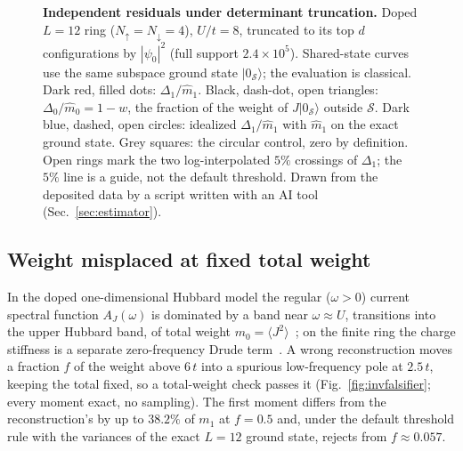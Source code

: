 \documentclass[aps,prb,reprint,onecolumn,12pt,superscriptaddress,longbibliography,floatfix]{revtex4-2}
\newcommand{\colfig}{\setlength{\columnwidth}{0.62\textwidth}}%
\newcommand{\colfig}{}
\begin{document}
\begin{figure}[t]
\centering\colfig
{}
\caption{\textbf{Independent residuals under determinant truncation.} Doped $L=12$ ring ($N_\uparrow=N_\downarrow=4$), $U/t=8$, truncated to its top $d$ configurations by $|\psi_0|^2$ (full support $2.4\times10^5$). Shared-state curves use the same subspace ground state $|0_\mathcal{S}\rangle$; the evaluation is classical. Dark red, filled dots: $\Delta_1/\widehat m_1$. Black, dash-dot, open triangles: $\Delta_0/\widehat m_0=1-w$, the fraction of the weight of $J|0_\mathcal{S}\rangle$ outside $\mathcal{S}$. Dark blue, dashed, open circles: idealized $\Delta_1/\widehat m_1$ with $\widehat m_1$ on the exact ground state. Grey squares: the circular control, zero by definition. Open rings mark the two log-interpolated $5\%$ crossings of $\Delta_1$; the $5\%$ line is a guide, not the default threshold. Drawn from the deposited data by a script written with an AI tool (Sec.~\ref{sec:estimator}).}
\label{fig:teethshared}
\end{figure}

\subsection{Weight misplaced at fixed total weight}
\label{sec:fixedtotal}
In the doped one-dimensional Hubbard model the regular ($\omega>0$) current spectral function $A_J(\omega)$ is dominated by a band near $\omega\approx U$, transitions into the upper Hubbard band, of total weight $m_0=\langle J^2\rangle$~\cite{Maldague1977,Basov2011}; on the finite ring the charge stiffness is a separate zero-frequency Drude term~\cite{Kohn1964}. A wrong reconstruction moves a fraction $f$ of the weight above $6\,t$ into a spurious low-frequency pole at $2.5\,t$, keeping the total fixed, so a total-weight check passes it (Fig.~\ref{fig:invfalsifier}; every moment exact, no sampling). The first moment differs from the reconstruction's by up to $38.2\%$ of $m_1$ at $f=0.5$ and, under the default threshold rule with the variances of the exact $L=12$ ground state, rejects from $f\approx0.057$.
\end{document}
